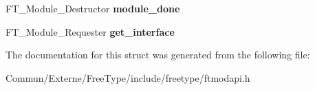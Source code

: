 \begin{DoxyCompactItemize}
\item 
F\+T\+\_\+\+Module\+\_\+\+Destructor {\bfseries module\+\_\+done}\hypertarget{struct_f_t___module___class___ab6e9c780519e24a51144df79692cf339}{}\label{struct_f_t___module___class___ab6e9c780519e24a51144df79692cf339}

\item 
F\+T\+\_\+\+Module\+\_\+\+Requester {\bfseries get\+\_\+interface}\hypertarget{struct_f_t___module___class___aa72d79fcd0991231e24e88f359244e8e}{}\label{struct_f_t___module___class___aa72d79fcd0991231e24e88f359244e8e}

\end{DoxyCompactItemize}


The documentation for this struct was generated from the following file\+:\begin{DoxyCompactItemize}
\item 
Commun/\+Externe/\+Free\+Type/include/freetype/ftmodapi.\+h\end{DoxyCompactItemize}
